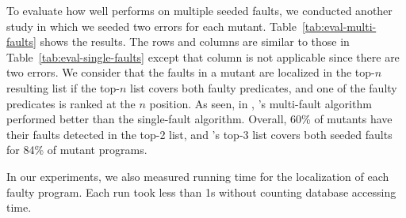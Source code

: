 To evaluate how well \tool{} performs on multiple seeded faults, we
conducted another study in which we seeded two errors for each
mutant. Table~\ref{tab:eval-multi-faults} shows the results.
The rows and columns are similar to those in
Table~\ref{tab:eval-single-faults} except that column  is
not applicable since there are two errors. We consider that the faults
in a mutant are localized in the top-$n$ resulting list if the top-$n$
list covers both faulty predicates, and one of the faulty predicates
is ranked at the $n$ position. As seen, in ,
\tool{}'s multi-fault algorithm performed better than the single-fault
algorithm. Overall, 60\% of mutants have their faults detected in the
top-2 list, and \tool{}'s top-3 list covers both seeded faults for
84\% of mutant programs.

 In our experiments, we also
measured running time for the localization of each faulty
program. Each run took less than 1s without counting database
accessing time.



